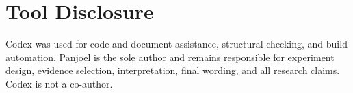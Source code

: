 \documentclass[11pt]{article}
\begin{document}
\section*{Tool Disclosure}

Codex was used for code and document assistance, structural checking, and build automation. Panjoel is the sole author and remains responsible for experiment design, evidence selection, interpretation, final wording, and all research claims. Codex is not a co-author.



\end{document}
